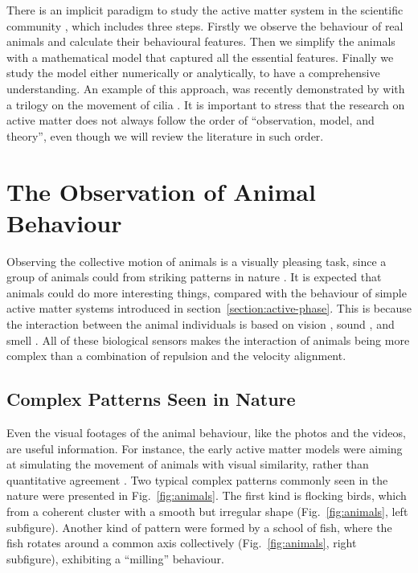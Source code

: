 \documentclass[11pt,twoside]{report}
\begin{document}
There is an implicit paradigm to study the active matter system in the scientific community \cite{allen2017}, which includes three steps. Firstly we observe the behaviour of real animals and calculate their behavioural features. Then we simplify the animals with a mathematical model that captured all the essential features. Finally we study the model either numerically or analytically, to have a comprehensive understanding. An example of this approach, was recently demonstrated by \citeauthor{bull2021ep3} with a trilogy
on the movement of cilia \cite{bull2021ep1, bull2021ep2, bull2021ep3}. It is important to stress that the research on active matter does not always follow the order of ``observation, model, and theory'', even though we will review the literature in such order.


\section{The Observation of Animal Behaviour}
\label{section:intro-observe}

Observing the collective motion of animals is a visually pleasing task, since a group of animals could from striking patterns in nature \cite{vicsek2012}. 
It is expected that animals could do more interesting things, compared with the behaviour of simple active matter systems introduced in section~\ref{section:active-phase}. This is because the interaction between the animal individuals is based on vision \cite{strandburg-peshkin2013}, sound \cite{ota2020}, and smell \cite{miller2022}. All of these biological sensors makes the interaction of animals being more complex than a combination of repulsion and the velocity alignment.

\subsection {Complex Patterns Seen in Nature}

Even the visual footages of the animal behaviour, like the photos and the videos, are useful information.
For instance, the early active matter models were aiming at simulating the movement of animals with visual similarity, rather than quantitative agreement \cite{reynolds1987, vicsek1995, couzin2002}.
Two typical complex patterns commonly seen in the nature were presented in Fig.~\ref{fig:animals}. The first kind is flocking birds, which from a coherent cluster with a smooth but irregular shape (Fig.~\ref{fig:animals}, left subfigure). Another kind of pattern were formed by a school of fish, where the fish rotates around a common axis collectively (Fig.~\ref{fig:animals}, right subfigure), exhibiting a ``milling'' behaviour.
\end{document}

